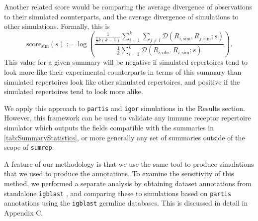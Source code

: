 \documentclass{article}
\begin{document}
Another related score would be comparing the average divergence of observations to their simulated counterparts, and the average divergence of simulations to other simulations.
Formally, this is
\begin{equation}
    \text{score}_\text{sim}(s) := 
    \log \left( 
        \frac{ 
            \frac{1}{\frac{1}{2} k\left(k - 1\right)}
            \sum_{i=1}^{k}
            \sum_{j \ne i}
                \mathcal D\left(R_{i, \text{sim}}, R_{j, \text{sim}}; s\right) 
        }
        { 
            \frac{1}{k} 
            \sum_{i = 1}^k 
                \mathcal D \left( R_{i, \text{obs}}, R_{i, \text{sim}} ; s\right) 
        } 
    \right).
\end{equation}
This value for a given summary will be negative if simulated repertoires tend to look more like their experimental counterparts in terms of this summary than simulated repertoires look like other simulated repertoires, and positive if the simulated repertoires tend to look more alike.

We apply this approach to \texttt{partis} and \texttt{igor} simulations in the Results section.
However, this framework can be used to validate any immune receptor repertoire simulator which outputs the fields compatible with the summaries in \ref{tab:SummaryStatistics}, or more generally any set of summaries outside of the scope of \texttt{sumrep}.

A feature of our methodology is that we use the same tool to produce simulations that we used to produce the annotations.
To examine the sensitivity of this method, we performed a separate analysis by obtaining dataset annotations from standalone \texttt{igblast} \cite{Ye2013-kl}, and comparing these to simulations based on \texttt{partis} annotations using the \texttt{igblast} germline databases.
This is discussed in detail in Appendix C.
\end{document}
